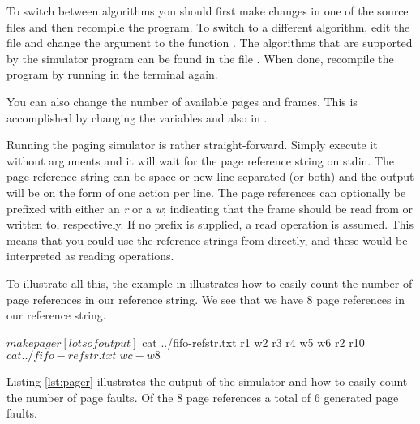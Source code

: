 \documentclass[a4paper,nocourse]{miunasgn}
\begin{document}
To switch between algorithms you should first make changes in one of the source 
files and then recompile the program.
To switch to a different algorithm, edit the file  and change the 
argument to the function .
The algorithms that are supported by the simulator program can be found in the 
file .
When done, recompile the program by running  in the terminal 
again.

You can also change the number of available pages and frames.
This is accomplished by changing the variables  and  
also in .

Running the paging simulator is rather straight-forward.
Simply execute it without arguments and it will wait for the page reference 
string on stdin.
The page reference string can be space or new-line separated (or both) and the 
output will be on the form of one action per line.
The page references can optionally be prefixed with either an \emph{r} or 
a \emph{w}; indicating that the frame should be read from or written to, 
respectively.
If no prefix is supplied, a read operation is assumed.
This means that you could use the reference strings from 
\cite{Silberschatz2009osc,Silberschatz2013osc,Silberschatz2013intl} directly, 
and these would be interpreted as reading operations.

To illustrate all this, the example in  illustrates 
how to easily count the number of page references in our reference string.
We see that we have 8 page references in our reference string.

\begin{terminal}[float,label={lst:reflength},caption={An example from the 
  UNIX-like terminal of how to compute the length of the reference string.}]
$ make pager
[lots of output]
$ cat ../fifo-refstr.txt
r1 w2 r3 r4
w5 w6 r2 r10
$ cat ../fifo-refstr.txt | wc -w
8
$
\end{terminal}

Listing \ref{lst:pager} illustrates the output of the simulator and how to 
easily count the number of page faults.
Of the 8 page references a total of 6 generated page faults.
\end{document}
